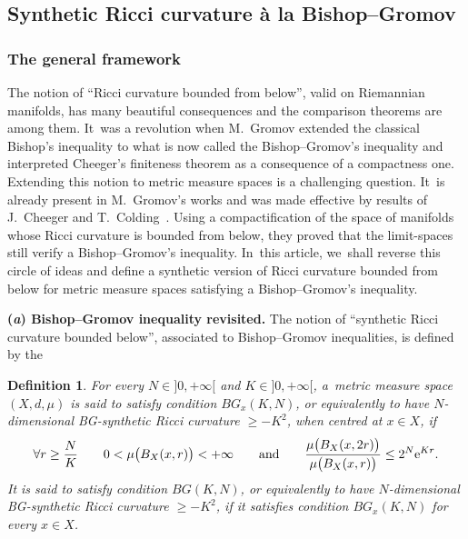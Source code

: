 \documentclass[pdftex]{sigma}
\numberwithin{equation}{section}
\newtheorem{defi}[theor]{Definition}
\begin{document}
\subsection{Synthetic Ricci curvature \`a la Bishop--Gromov}

\subsubsection{The general framework}\label{generalframe}

The notion of ``Ricci curvature bounded from below'', valid on Riemannian manifolds, has many beautiful consequences and the comparison theorems are among them. It~was a revolution when M.~Gromov extended the classical Bishop's inequality to what is now called the Bishop--Gromov's inequality and interpreted Cheeger's finiteness theorem as a consequence of a compactness one. Extending this notion to metric measure spaces is a challenging question. It~is already present in M.~Gromov's works and was made effective by results of J.~Cheeger and T.~Colding~\cite{CC97, CC00a, CC00b}.
Using a compactification of the space of manifolds whose Ricci curvature is bounded from below, they proved that the limit-spaces still verify a Bishop--Gromov's inequality. In~this article, we~shall reverse this circle of
ideas and define a synthetic version of Ricci curvature bounded from below for metric measure spaces satisfying a Bishop--Gromov's inequality.

\medskip\noindent
{\bf (\emph{a}) Bishop--Gromov inequality revisited.}
The notion of ``synthetic Ricci curvature bounded below'', associated to Bishop--Gromov inequalities, is defined by the

\begin{defi}\label{Riccisynthetic0}
For every $N \in{} ]0, + \infty[$ and $K \in{} ]0, + \infty[$, a~metric measure space $(X,d,\mu)$ is said to satisfy condition $BG_x (K,N)$, or equivalently to
 have $N$-dimensional BG-synthetic Ricci curvature $\ge -K^2$, when centred at $x \in X$, if
\begin{equation}
\label{synthetic0}
\forall r \ge \frac{N}{K}\qquad 0 < \mu \big(B_X(x, r)\big) < +\infty \qquad \text{and} \qquad \frac{\mu \big( B_X(x, 2 r)\big)}{\mu \big( B_X(x,r)\big)} \le
2^{N}{\rm e}^{K r}.
\end{equation}
It is said to satisfy condition $BG (K,N)$, or equivalently to have $N$-dimensional BG-synthetic Ricci curvature $\ge -K^2$, if it satisfies condition
$BG_x (K,N)$ for every $x \in X$.
\end{defi}
\end{document}
